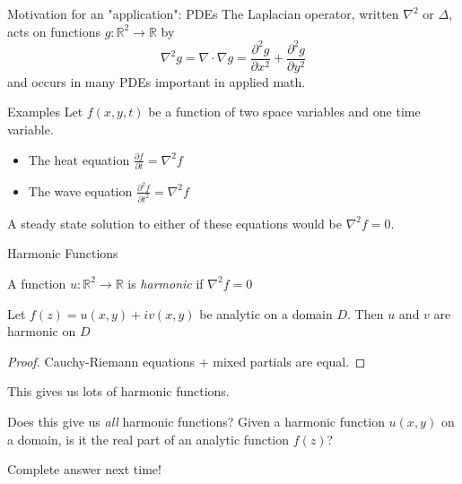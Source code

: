 \documentclass{beamer}
\newcommand{\R}{\mathbb{R}}
\begin{document}
\begin{frame}{Motivation for an "application": PDEs}
The Laplacian operator, written $\nabla^2$ or $\Delta$, acts on functions $g:\R^2\to\R$ by
$$\nabla^2g=\nabla\cdot\nabla g=\frac{\partial^2 g}{\partial x^2}+\frac{\partial^2 g}{\partial y^2}$$
and occurs in many PDEs important in applied math.  

\begin{block}{Examples}
Let $f(x,y,t)$ be a function of two space variables and one time variable.
\begin{itemize}
    \item The heat equation $\frac{\partial f}{\partial t}=\nabla^2f$
    \item The wave equation $\frac{\partial^2 f}{\partial t^2}=\nabla^2f$
\end{itemize}
\end{block}
A steady state solution to either of these equations would be $\nabla^2f=0$.  
\end{frame}

\begin{frame}{Harmonic Functions}
\begin{definition}
A function $u:\R^2\to\R$ is \emph{harmonic} if $\nabla^2f=0$
\end{definition}

\begin{lemma}Let $f(z)=u(x,y)+iv(x,y)$ be analytic on a domain $D$.  Then $u$ and $v$ are harmonic on $D$
\end{lemma}
\begin{proof} Cauchy-Riemann equations + mixed partials are equal.
\end{proof}
This gives us lots of harmonic functions.  
\begin{block}{Does this give us \emph{all} harmonic functions?}
Given a harmonic function $u(x,y)$ on a domain, is it the real part of an analytic function $f(z)$?
\end{block}
\begin{block}{Complete answer next time!}
\end{block}

\end{frame}
\end{document}
